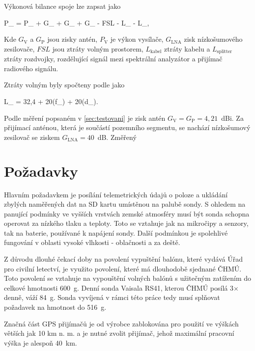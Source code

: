 \documentclass[twoside]{ctuthesis}
\newcommand{\mt}[1]{\text{#1}}
\theoremstyle{plain}
\theoremstyle{definition}
\theoremstyle{note}
\begin{document}
		Výkonová bilance spoje lze zapsat jako
		\begin{split}
			P_\mt{P} = P_\mt{V} + G_\mt{V} + G_\mt{P} + G_\mt{LNA} - FSL - L_\mt{kabel} - L_\mt{splitter},
		\end{split}
		Kde $G_\mt{V}$ a $G_\mt{P}$ jsou zisky antén, $P_\mt{V}$ je výkon vysílače, $G_\mt{LNA}$ zisk nízkošumového zesilovače, $FSL$ jsou ztráty volným prostorem, $L_\mt{kabel}$ ztráty kabelu a $L_\mt{splitter}$ ztráty rozdvojky, rozdělující signál mezi spektrální analyzátor a přijímač radiového signálu.

		Ztráty volným byly spočteny podle \cite{zaklady:sireni:vln} jako
		\begin{split}
			L_\mt{FSL} = 32,4 + 20\mt{log}(f_\mt{MHz}) + 20\mt{log}(d_\mt{km}).
		\end{split}
		
		Podle měření popsaném v \ref{sec:testovani} je zisk antén $G_\mt{V} = G_\mt{P} = 4,21$~dBi. Za přijímací anténou, která je součástí pozemního segmentu, se nachází nízkošumový zesilovač se ziskem $G_\mt{LNA} = 40$~dB. Změřený 


	\section{Požadavky}
	Hlavním požadavkem je posílání telemetrických údajů o poloze a ukládání zbylých naměřených dat na SD kartu umístěnou na palubě sondy. S ohledem na panující podmínky ve vyšších vrstvách zemské atmosféry musí být sonda schopna operovat za nízkého tlaku a teploty. Toto se vztahuje jak na mikročipy a senzory, tak na baterie, používané k napájení sondy. Další podmínkou je spolehlivé fungování v oblasti vysoké vlhkosti - oblačnosti a za deště. 

	Z důvodu dlouhé čekací doby na povolení vypuštění balónu, které vydává Úřad pro civilní letectví, je využito povolení, které má dlouhodobě sjednané ČHMÚ. Toto povolení se vztahuje na vypouštění volných balónů s užitečným zatížením do celkové hmotnosti 600~g. Denní sonda Vaisala RS41, kterou ČHMÚ posílá 3$\times$ denně, váží 84~g. Sonda vyvíjená v rámci této práce tedy musí splňovat požadavek na hmotnost do 516~g.

	Značná část GPS přijímačů je od výrobce zablokována pro použití ve výškách větších jak 10 km n. m. a je nutné zvolit přijímač, jehož maximální pracovní výška je alespoň 40~km.
\end{document}
